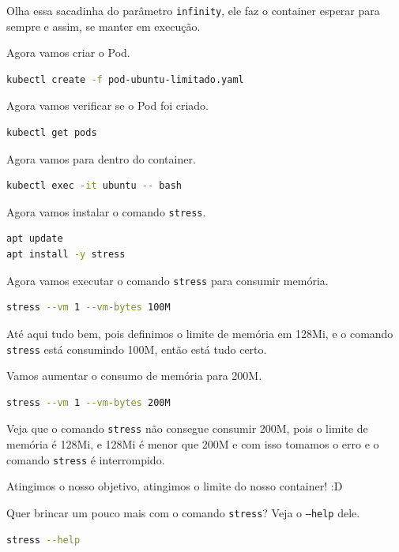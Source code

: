 \documentclass[12pt,a4paper]{article}
\begin{document}
Olha essa sacadinha do parâmetro \texttt{infinity}, ele faz o container esperar para sempre e assim, se manter em execução.

Agora vamos criar o Pod.

\begin{lstlisting}[language=bash]
kubectl create -f pod-ubuntu-limitado.yaml
\end{lstlisting}

Agora vamos verificar se o Pod foi criado.

\begin{lstlisting}[language=bash]
kubectl get pods
\end{lstlisting}

Agora vamos para dentro do container.

\begin{lstlisting}[language=bash]
kubectl exec -it ubuntu -- bash
\end{lstlisting}

Agora vamos instalar o comando \texttt{stress}.

\begin{lstlisting}[language=bash]
apt update
apt install -y stress
\end{lstlisting}

Agora vamos executar o comando \texttt{stress} para consumir memória.

\begin{lstlisting}[language=bash]
stress --vm 1 --vm-bytes 100M
\end{lstlisting}

Até aqui tudo bem, pois definimos o limite de memória em 128Mi, e o comando \texttt{stress} está consumindo 100M, então está tudo certo.

Vamos aumentar o consumo de memória para 200M.

\begin{lstlisting}[language=bash]
stress --vm 1 --vm-bytes 200M
\end{lstlisting}

Veja que o comando \texttt{stress} não consegue consumir 200M, pois o limite de memória é 128Mi, e 128Mi é menor que 200M e com isso tomamos o erro e o comando \texttt{stress} é interrompido.

Atingimos o nosso objetivo, atingimos o limite do nosso container! :D

Quer brincar um pouco mais com o comando \texttt{stress}? Veja o \texttt{--help} dele.

\begin{lstlisting}[language=bash]
stress --help
\end{lstlisting}
\end{document}
